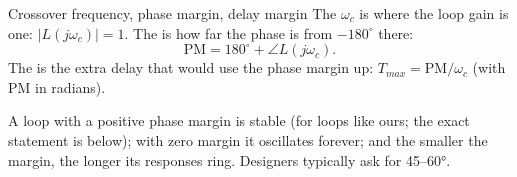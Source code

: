 \begin{definition}{Crossover frequency, phase margin, delay margin}
The  $\omega_c$ is where the loop gain is one: $|L(j\omega_c)| = 1$. The  is how far the phase is from $-180^\circ$ there:
\begin{equation*}
  \mathrm{PM} = 180^\circ + \angle L(j\omega_c).
\end{equation*}
The  is the extra delay that would use the phase margin up: $T_{max} = \mathrm{PM}/\omega_c$ (with PM in radians).
\end{definition}

A loop with a positive phase margin is stable (for loops like ours; the exact statement is below); with zero margin it oscillates forever; and the smaller the margin, the longer its responses ring. Designers typically ask for 45–60°.

